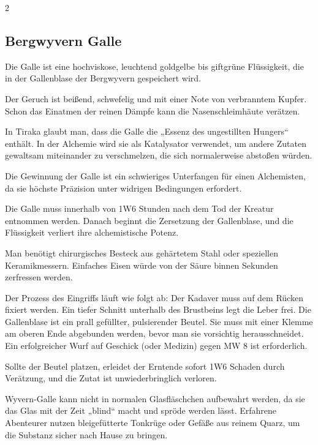 \begin{multicols}{2}


    \subsection*{Bergwyvern Galle}

    Die Galle ist eine hochviskose, leuchtend goldgelbe bis giftgrüne Flüssigkeit, die in der Gallenblase der Bergwyvern gespeichert wird.

Der Geruch ist beißend, schwefelig und mit einer Note von verbranntem Kupfer. Schon das Einatmen der reinen Dämpfe kann die Nasenschleimhäute verätzen.

In Tiraka glaubt man, dass die Galle die „Essenz des ungestillten Hungers“ enthält. In der Alchemie wird sie als Katalysator verwendet, um andere Zutaten gewaltsam miteinander zu verschmelzen, die sich normalerweise abstoßen würden.

Die Gewinnung der Galle ist ein schwieriges Unterfangen für einen Alchemisten, da sie höchste Präzision unter widrigen Bedingungen erfordert.

Die Galle muss innerhalb von 1W6 Stunden nach dem Tod der Kreatur entnommen werden. Danach beginnt die Zersetzung der Gallenblase, und die Flüssigkeit verliert ihre alchemistische Potenz.

Man benötigt chirurgisches Besteck aus gehärtetem Stahl oder speziellen Keramikmessern. Einfaches Eisen würde von der Säure binnen Sekunden zerfressen werden.

Der Prozess des Eingriffs läuft wie folgt ab: Der Kadaver muss auf dem Rücken fixiert werden.
Ein tiefer Schnitt unterhalb des Brustbeins legt die Leber frei.
Die Gallenblase ist ein prall gefüllter, pulsierender Beutel. Sie muss mit einer Klemme am oberen Ende abgebunden werden, bevor man sie vorsichtig herausschneidet. Ein erfolgreicher Wurf auf Geschick (oder Medizin) gegen MW 8 ist erforderlich.

Sollte der Beutel platzen, erleidet der Erntende sofort 1W6 Schaden durch Verätzung, und die Zutat ist unwiederbringlich verloren. 

Wyvern-Galle kann nicht in normalen Glasfläschchen aufbewahrt werden, da sie das Glas mit der Zeit „blind“ macht und spröde werden lässt. Erfahrene Abenteurer nutzen bleigefütterte Tonkrüge oder Gefäße aus reinem Quarz, um die Substanz sicher nach Hause zu bringen.


\end{multicols}

